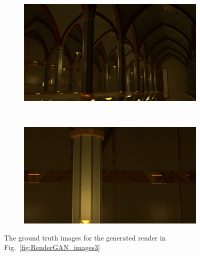 \begin{figure}[h!]
    \centering
    \begin{subfigure}[b]{0.9\textwidth}
     \includegraphics[width=\textwidth]{figures/result/gt/s1_camera_95_cycles.png}
     \caption{}
    \end{subfigure}
    \\ \vspace{0.2cm}
    \begin{subfigure}[b]{0.9\textwidth}
     \includegraphics[width=\textwidth]{figures/result/gt/s1_camera_2_cycles.png}
     \caption{}
    \end{subfigure}
    \caption[Cycles Render]{The ground truth images for the generated render in Fig.~\ref{fig:RenderGAN_images3}}
    \label{fig:gt_images3}
\end{figure}

